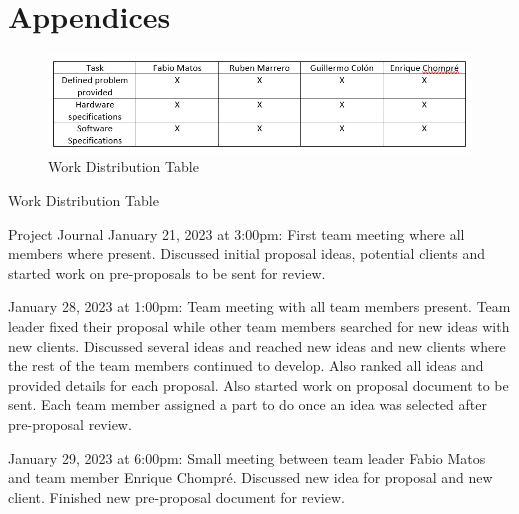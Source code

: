 \section{Appendices}
\begin{figure}[H]
  \centering
  \includegraphics[width=\textwidth]{../Appendices/Figures/work-distrobution-table.jpeg}
  \caption{Work Distribution Table}
\end{figure}
Work Distribution Table

Project Journal 
January 21, 2023 at 3:00pm: First team meeting where all members where present. Discussed initial proposal ideas, potential clients and started work on pre-proposals to be sent for review.

January 28, 2023 at 1:00pm: Team meeting with all team members present. Team leader fixed their proposal while other team members searched for new ideas with new clients. Discussed several ideas and reached new ideas and new clients where the rest of the team members continued to develop. Also ranked all ideas and provided details for each proposal. Also started work on proposal document to be sent. Each team member assigned a part to do once an idea was selected after pre-proposal review. 

January 29, 2023 at 6:00pm: Small meeting between team leader Fabio Matos and team member Enrique Chompré. Discussed new idea for proposal and new client. Finished new pre-proposal document for review.

